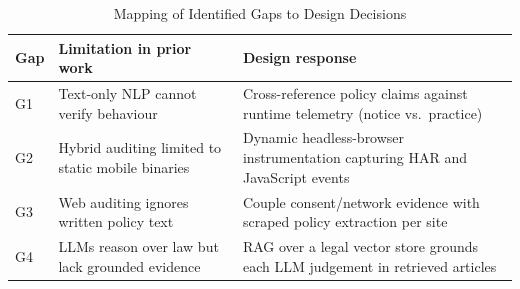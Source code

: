 \documentclass[conference]{IEEEtran}
\begin{document}
\begin{table}[!t]
\centering
\caption{Mapping of Identified Gaps to Design Decisions}
\label{tab:gap_design}
\footnotesize
\begin{tabular}{P{0.5cm} P{3.3cm} P{3.4cm}}
\toprule
\textbf{Gap} & \textbf{Limitation in prior work} & \textbf{Design response} \\
\midrule
G1 & Text-only NLP cannot verify behaviour~\cite{wilson-2016-opp115,harkous-2018-polisis,ravichander-2019-privacyqa} & Cross-reference policy claims against runtime telemetry (notice vs.\ practice) \\
\addlinespace
G2 & Hybrid auditing limited to static mobile binaries~\cite{zimmeck-2017-mobileapps,zimmeck-2019-maps,xiao-2023-lalaine} & Dynamic headless-browser instrumentation capturing HAR and JavaScript events \\
\addlinespace
G3 & Web auditing ignores written policy text~\cite{trevisan-2019-cookielaw,bouhoula-2024-cookies} & Couple consent/network evidence with scraped policy extraction per site \\
\addlinespace
G4 & LLMs reason over law but lack grounded evidence~\cite{guha-2023-legalbench,xie-2025-llmpolicy} & RAG over a legal vector store grounds each LLM judgement in retrieved articles \\
\bottomrule
\end{tabular}
\end{table}
\end{document}
